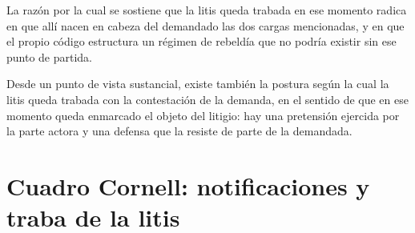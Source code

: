 \documentclass[12pt,oneside]{book}
\begin{document}
La razón por la cual se sostiene que la litis queda trabada en ese momento radica en que allí nacen en cabeza del demandado las dos cargas mencionadas, y en que el propio código estructura un régimen de rebeldía que no podría existir sin ese punto de partida.

\begin{note}
Desde un punto de vista sustancial, existe también la postura según la cual la litis queda trabada con la contestación de la demanda, en el sentido de que en ese momento queda enmarcado el objeto del litigio: hay una pretensión ejercida por la parte actora y una defensa que la resiste de parte de la demandada.
\end{note}

\section{Cuadro Cornell: notificaciones y traba de la litis}
\end{document}
